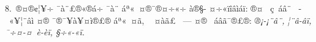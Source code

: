 \documentclass[12pt,twoside,a4paper]{article}
\begin{document}
8.~^^8f^^ae^^a4^^ae^^a2^^a6^^a5^^ad^^f7 ^^af^^e0^^a8^^a3^^ae^^ab^^ae^^e1^^ad^^f7 ^^af^^e0^^a8 ^^e1^^aa^^ab^^a0^^a4^^ae^^af^^ae^^a4^^f7^^ab^^f7 ^^e0^^ae^^a7-\linebreak
^^a4^^f7^^ab^^ef^^ee^^e2^^ec^^e1^^ef: ^^ae^^a4^^ad^^a0 ^^e7^^a0^^e1^^e2^^a8^^ad^^a0 ^^ad^^a0^^ab^^a5^^a6^^a8^^e2^^ec ^^a4^^ae ^^af^^ae^^af^^a5^^e0^^a5^^a4^^ad^^ec^^ae^^a3^^ae\linebreak
^^e1^^aa^^ab^^a0^^a4^^e3, ^^a0 ^^a4^^e0^^e3^^a3^^a0 --- ^^a4^^ae ^^ad^^a0^^e1^^e2^^e3^^af^^ad^^ae^^a3^^ae: \emph{^^ae^^a1-^^a1^^a8^^e2^^a8, ^^a6^^a8^^e2-^^e2^^ef,\linebreak
^^af^^f7^^a4-^^a4^^a0^^e8-^^e8^^ef, ^^a7^^f7^^ab-^^ab^^ef.} 
\end{document}
